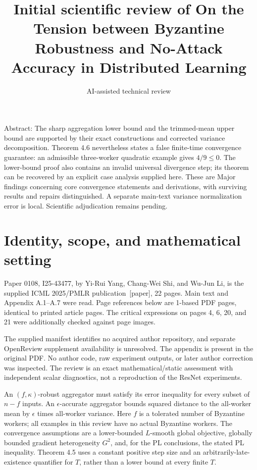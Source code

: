 \documentclass[10pt]{article}
\title{Initial scientific review of
On the Tension between Byzantine Robustness and No-Attack Accuracy in Distributed Learning}
\author{AI-assisted technical review}
\date{}
\begin{document}
\maketitle
Abstract: The sharp aggregation lower bound and the trimmed-mean upper bound are supported by their exact constructions and corrected variance decomposition. Theorem 4.6 nevertheless states a false finite-time convergence guarantee: an admissible three-worker quadratic example gives \(4/9\leq0\). The lower-bound proof also contains an invalid universal divergence step; its theorem can be recovered by an explicit case analysis supplied here. These are Major findings concerning core convergence statements and derivations, with surviving results and repairs distinguished. A separate main-text variance normalization error is local. Scientific adjudication remains pending.\par
\section*{Identity, scope, and mathematical setting}
Paper 0108, I25-43477, by Yi-Rui Yang, Chang-Wei Shi, and Wu-Jun Li, is the supplied ICML 2025/PMLR publication [paper], 22 pages. Main text and Appendix A.1–A.7 were read. Page references below are 1-based PDF pages, identical to printed article pages. The critical expressions on pages 4, 6, 20, and 21 were additionally checked against page images.\par
The supplied manifest identifies no acquired author repository, and separate OpenReview supplement availability is unresolved. The appendix is present in the original PDF. No author code, raw experiment outputs, or later author correction was inspected. The review is an exact mathematical/static assessment with independent scalar diagnostics, not a reproduction of the ResNet experiments.\par
An \((f,\kappa)\)-robust aggregator must satisfy its error inequality for every subset of \(n-f\) inputs. An \(\epsilon\)-accurate aggregator bounds squared distance to the all-worker mean by \(\epsilon\) times all-worker variance. Here \(f\) is a tolerated number of Byzantine workers; all examples in this review have no actual Byzantine workers. The convergence assumptions are a lower-bounded \(L\)-smooth global objective, globally bounded gradient heterogeneity \(G^2\), and, for the PL conclusions, the stated PL inequality. Theorem 4.5 uses a constant positive step size and an arbitrarily-late-existence quantifier for \(T\), rather than a lower bound at every finite \(T\).\par
\end{document}
